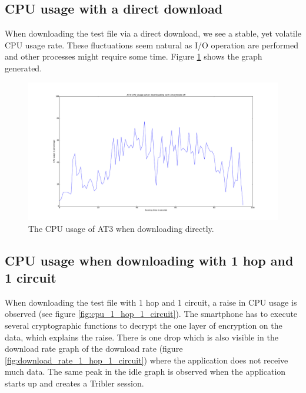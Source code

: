 	\subsection{CPU usage with a direct download}
		When downloading the test file via a direct download, we see a stable, yet volatile CPU usage rate.
		These fluctuations seem natural as I/O operation are performed and other processes might require some time. 
		Figure \ref{fig:cpu_anonmode_off} shows the graph generated.
		
		\begin{figure}[!htb]
			\centering
			\includegraphics[width=\textwidth]{graphics/cpu_usage_anonmode_off.pdf}
			\caption{The CPU usage of AT3 when downloading directly.}
			\label{fig:cpu_anonmode_off}
		\end{figure}
		
	\subsection{CPU usage when downloading with 1 hop and 1 circuit}
		When downloading the test file with 1 hop and 1 circuit, a raise in CPU usage is observed (see figure \ref{fig:cpu_1_hop_1_circuit}). The smartphone has to execute several cryptographic functions to decrypt the one layer of encryption on the data, which explains the raise. There is one drop which is also visible in the download rate graph of the download rate (figure \ref{fig:download_rate_1_hop_1_circuit}) where the application does not receive much data.
		The same peak in the idle graph is observed when the application starts up and creates a Tribler session.
		
